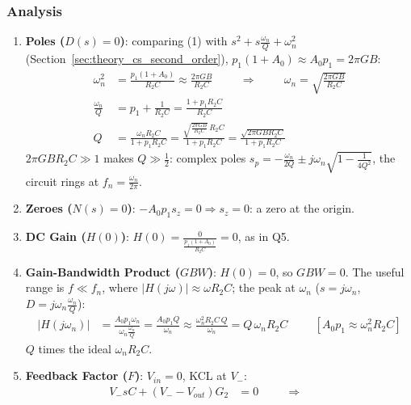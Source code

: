 \subsubsection{Analysis}
\begin{enumerate}
  \item \textbf{Poles (\(D(s) = 0\))}: comparing (1) with \(s^2 + s\frac{\omega_n}{Q} + \omega_n^2\)
    (Section~\ref{sec:theory_cs_second_order}), \(p_1(1 + A_0) \approx A_0 p_1 = 2\pi GB\):
    \begin{align*}
      \omega_n^2 &= \frac{p_1 (1 + A_0)}{R_2 C} \approx \frac{2\pi GB}{R_2 C} \hspace{1cm} \Rightarrow \hspace{1cm} \omega_n = \sqrt{\frac{2\pi GB}{R_2 C}} \\
      \frac{\omega_n}{Q} &= p_1 + \frac{1}{R_2 C} = \frac{1 + p_1 R_2 C}{R_2 C} \\
      Q &= \frac{\omega_n R_2 C}{1 + p_1 R_2 C} = \frac{\sqrt{\frac{2\pi GB}{R_2 C}}\, R_2 C}{1 + p_1 R_2 C} = \frac{\sqrt{2\pi GB R_2 C}}{1 + p_1 R_2 C}
    \end{align*}
    \(2\pi GB R_2 C \gg 1\) makes \(Q \gg \frac{1}{2}\): complex poles
    \(s_p = -\frac{\omega_n}{2Q} \pm j\omega_n\sqrt{1 - \frac{1}{4Q^2}}\), the circuit rings at \(f_n = \frac{\omega_n}{2\pi}\).
  \item \textbf{Zeroes (\(N(s) = 0\))}: \(-A_0 p_1 s_z = 0 \Rightarrow s_z = 0\): a zero at the origin.
  \item \textbf{DC Gain (\(H(0)\))}: \(H(0) = \frac{0}{\frac{p_1(1 + A_0)}{R_2 C}} = 0\), as in Q5.
  \item \textbf{Gain-Bandwidth Product (\(GBW\))}: \(H(0) = 0\), so \(GBW = 0\). The useful
    range is \(f \ll f_n\), where \(|H(j\omega)| \approx \omega R_2 C\); the peak at \(\omega_n\)
    (\(s = j\omega_n\), \(D = j\omega_n\frac{\omega_n}{Q}\)):
    \begin{align*}
      |H(j\omega_n)| &= \frac{A_0 p_1 \omega_n}{\omega_n\frac{\omega_n}{Q}} = \frac{A_0 p_1 Q}{\omega_n} \approx \frac{\omega_n^2 R_2 C\, Q}{\omega_n} = Q\,\omega_n R_2 C \hspace{1cm} [A_0 p_1 \approx \omega_n^2 R_2 C]
    \end{align*}
    \(Q\) times the ideal \(\omega_n R_2 C\).
  \item \textbf{Feedback Factor (\(F\))}: \(V_{in} = 0\), KCL at \(V_-\):
    \begin{align*}
      V_- sC + (V_- - V_{out}) G_2 &= 0 \hspace{1cm} \Rightarrow \hspace{1cm}

\end{align*}
\end{enumerate}
